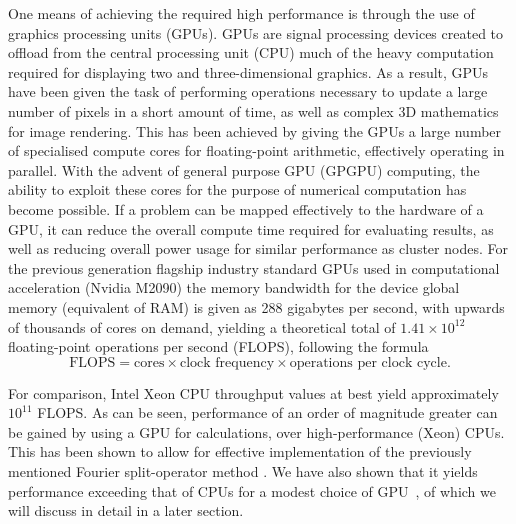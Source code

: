 One means of achieving the required high performance is through the use of graphics processing units (GPUs). GPUs are signal processing devices created to offload from the central processing unit (CPU) much of the heavy computation required for displaying two and three-dimensional graphics. As a result, GPUs have been given the task of performing operations necessary to update a large number of pixels in a short amount of time, as well as complex 3D mathematics for image rendering. This has been achieved by giving the GPUs a large number of specialised compute cores for floating-point arithmetic, effectively operating in parallel. With the advent of general purpose GPU (GPGPU) computing, the ability to exploit these cores for the purpose of numerical computation has become possible. If a problem can be mapped effectively to the hardware of a GPU, it can reduce the overall compute time required for evaluating results, as well as reducing overall power usage for similar performance as cluster nodes. For the previous generation flagship industry standard GPUs used in computational acceleration (Nvidia M2090) the memory bandwidth for the device global memory (equivalent of RAM) is given as 288 gigabytes per second, with upwards of thousands of cores on demand, yielding a theoretical total of $1.41\times10^{12}$ floating-point operations per second (FLOPS), following the formula
\begin{equation}
    \text{FLOPS} = \text{cores}\times\text{clock frequency}\times\text{operations per clock cycle}.
\end{equation}

For comparison, Intel Xeon CPU throughput values at best yield approximately $10^{11}$ FLOPS. As can be seen, performance of an order of magnitude greater can be gained by using a GPU for calculations, over high-performance (Xeon) CPUs. This has been shown to allow for effective implementation of the previously mentioned Fourier split-operator method \cite{Num:Bauke_cpc_2011}. We have also shown that it yields performance exceeding that of CPUs for a modest choice of GPU~\cite{AO:Morgan_pra_2013}, of which we will discuss in detail in a later section.

